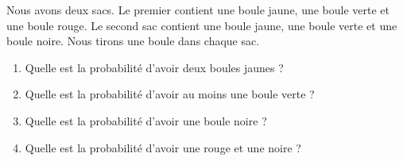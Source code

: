 
\begin{exercice}\label{exosmath-0198}

    Nous avons deux sacs. Le premier contient une boule jaune, une boule verte et une boule rouge. Le second sac contient une boule jaune, une boule verte et une boule noire. Nous tirons une boule dans chaque sac.
    \begin{enumerate}
        \item
            Quelle est la probabilité d'avoir deux boules jaunes ?
        \item
            Quelle est la probabilité d'avoir au moins une boule verte ?
        \item
            Quelle est la probabilité d'avoir une boule noire ?
        \item
            Quelle est la probabilité d'avoir une rouge et une noire ?
    \end{enumerate}

\end{exercice}
